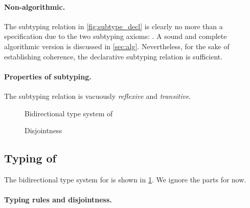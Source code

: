 \paragraph{Non-algorithmic.}
The subtyping relation in \cref{fig:subtype_decl} is clearly no more than a
specification due to the two subtyping axioms: . A sound
and complete algorithmic version is discussed in \cref{sec:alg}. Nevertheless,
for the sake of establishing coherence, the declarative subtyping relation is
sufficient.


\paragraph{Properties of subtyping.}
The subtyping relation is vacuously \emph{reflexive} and \emph{transitive}.


\begin{figure}[t]
  \centering
  \caption{Bidirectional type system of \namee}
  \label{fig:type:namee}
\end{figure}

\renewcommand{\rulehl}[1]{#1}

\begin{figure}[t]
  \centering
  \caption{Disjointness}
  \label{fig:disjoint}
\end{figure}



\subsection{Typing of \namee}

The bidirectional type system for \namee is shown in \cref{fig:type:namee}.
We ignore the  parts for now.

\paragraph{Typing rules and disjointness.}

